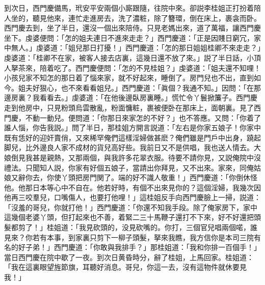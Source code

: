 到次日，西門慶備馬，玳安平安兩個小廝跟隨，往院中來。卻説李桂姐正打扮着陪人坐的，聽見他來，連忙走進房去，洗了濃粧，除了簪環，倒在床上，裹衾而卧。西門慶去到，坐了半日，還沒一個出來陪侍。只見老媽出來，道了萬福，讓西門慶坐下。虔婆便問：「怎的姐夫連日不進來走走？」西門慶道：「正是因賤日窮冗，家中無人。」虔婆道：「姐兒那日打擾！」西門慶道：「怎的那日姐姐桂卿不來走走？」虔婆道：「桂卿不在家，被客人接去店裏，這幾日還不放了來。」説了半日話，小頂人拏茶來，陪着吃了。西門慶便問：「怎的不見桂姐？」虔婆道：「姐夫還不知哩！小孩兒家不知怎的那日着了惱來家，就不好起來，睡倒了。房門兒也不出，直到如今。姐夫好狠心，也不來看看姐兒。」西門慶道：「眞個？我通不知。」因問：「在那邊房裏？我看看去。」虔婆道：「在他後邊臥房裏睡。」慌忙令丫鬟掀簾子。西門慶走到他房中，只見粉頭烏雲散亂，粉面慵粧，裹被便卧在那床上，面朝裏。見了西門慶，不動一動兒。便問道：「你那日來家怎的不好？」也不答應。又問：「你着了誰人惱，你告我説。」問了半日，那桂姐方開言説道：「左右是你家五娘子！你家中既有恁好的迎奸賣俏，又來稀罕俺們這樣淫婦做甚麽？俺們雖是門戶中出身，蹺起脚兒，比外邊良人家不成材的貨兒高好些。我前日又不是供唱，我也送人情去。大娘倒見我甚是親熱，又那兩個，與我許多花翠衣服。待要不請你見，又説俺院中沒禮法。只聞知人説，你家有好個五娘子，當請出你拜見，又不出來。家來，同俺姑娘又辭你去，你使丫頭把房門関了。端的好不識人敬重！」西門慶道：「你倒休怪他。他那日本等心中不自在。他若好時，有個不出來見你的？這個淫婦，我幾次因他再三咬羣兒，口嘴傷人，也要打他哩！」這桂姐反手向西門慶臉上一掃，説道：「沒羞的哥兒，你就打他！」西門慶道：「你還不知我手段。除了俺家房下，家中這幾個老婆丫頭，但打起來也不善，着緊二三十馬鞭子還打不下來，好不好還把頭髮都剪了！」桂姐道：「我見砍頭的，没見砍嘴的。你打，三個官兒唱兩個喏，誰見來？你若有本事，到家裏只剪下一柳子頭髮，拏來我瞧，我方信你是本司三院有名的好子弟！」西門慶道：「你敢與我排手？」那桂姐道：「我和你排一百個手！」當日西門慶在院中歇了一夜。到次日黄昏時分，辭了桂姐，上馬回家。桂姐道：「我在這裏眼望旌節旗，耳聽好消息。哥兒，你這一去，沒有這物件就休要見我！」

